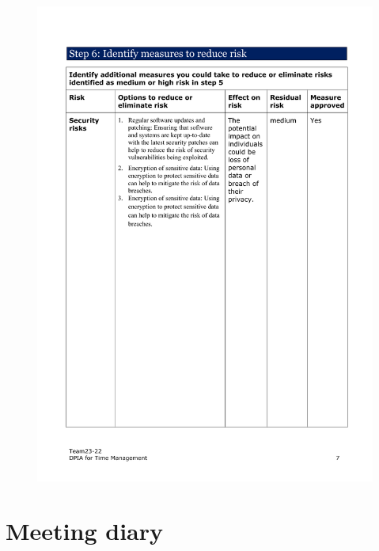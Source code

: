 \documentclass[a4paper]{article}
\begin{document}
\begin{figure}[H]
	\centering
	\includegraphics[width=1\textwidth]{./images/DPIA-Team23-22/DPIA-Team23-22_7.pdf}
	\label{Fig.DPIA_7}
\end{figure}

\section{Meeting diary}
\end{document}

